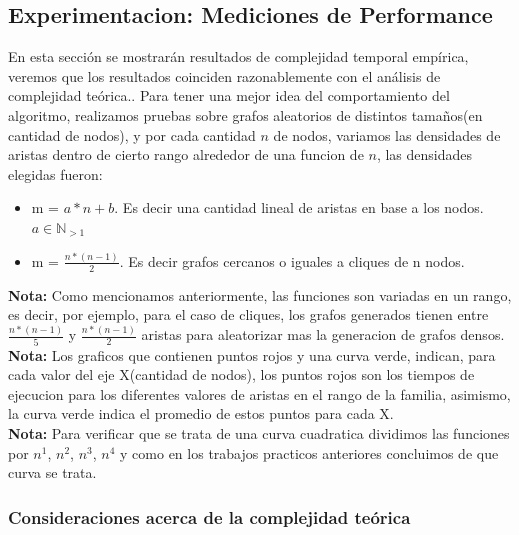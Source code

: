 \subsection{Experimentacion: Mediciones de Performance}
En esta secci\'on se mostrar\'an resultados de complejidad temporal emp\'irica, veremos que los resultados coinciden razonablemente con el an\'alisis de complejidad te\'orica..
Para tener una mejor idea del comportamiento del algoritmo, realizamos pruebas sobre grafos aleatorios de distintos tama\~nos(en cantidad de nodos), y por cada cantidad $n$ de nodos, variamos las densidades de aristas dentro de cierto rango alrededor de una funcion de $n$, las densidades elegidas fueron:
\begin{itemize}
	\item m = $a*n + b$. Es decir una cantidad lineal de aristas en base a los nodos. $a \in \mathbb{N}_{>1}$
	\item m = $\frac{n*(n-1)}{2}$. Es decir grafos cercanos o iguales a cliques de n nodos.
\end{itemize}


\textbf{Nota: } Como mencionamos anteriormente, las funciones son variadas en un rango, es decir, por ejemplo, para el caso de cliques, los grafos generados tienen entre $\frac{n*(n-1)}{5}$ y $\frac{n*(n-1)}{2}$ aristas para aleatorizar mas la generacion de grafos densos.\\

\textbf{Nota: } Los graficos que contienen puntos rojos y una curva verde, indican, para cada valor del eje X(cantidad de nodos), los puntos rojos son los tiempos de ejecucion para los diferentes valores de aristas en el rango de la familia, asimismo, la curva verde indica el promedio de estos puntos para cada X. \\
\textbf{Nota: }Para verificar que se trata de una curva cuadratica dividimos las funciones por $n^1$, $n^2$, $n^3$, $n^4$ y como en los trabajos practicos anteriores concluimos de que curva se trata.\\

\subsubsection{Consideraciones acerca de la complejidad te\'orica}

